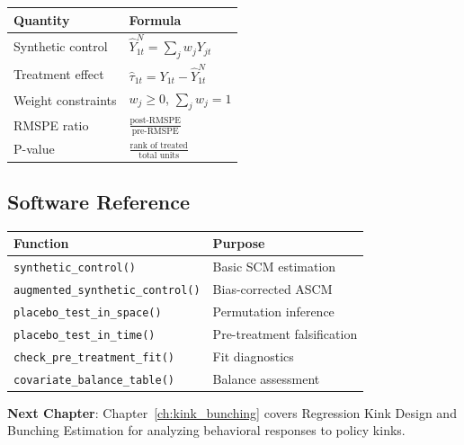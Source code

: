 \begin{center}
\begin{tabular}{ll}
\toprule
\textbf{Quantity} & \textbf{Formula} \\
\midrule
Synthetic control & $\hat{Y}_{1t}^N = \sum_j w_j Y_{jt}$ \\
Treatment effect & $\hat{\tau}_{1t} = Y_{1t} - \hat{Y}_{1t}^N$ \\
Weight constraints & $w_j \geq 0$, $\sum_j w_j = 1$ \\
RMSPE ratio & $\frac{\text{post-RMSPE}}{\text{pre-RMSPE}}$ \\
P-value & $\frac{\text{rank of treated}}{\text{total units}}$ \\
\bottomrule
\end{tabular}
\end{center}

\subsection{Software Reference}

\begin{center}
\begin{tabular}{ll}
\toprule
\textbf{Function} & \textbf{Purpose} \\
\midrule
\texttt{synthetic\_control()} & Basic SCM estimation \\
\texttt{augmented\_synthetic\_control()} & Bias-corrected ASCM \\
\texttt{placebo\_test\_in\_space()} & Permutation inference \\
\texttt{placebo\_test\_in\_time()} & Pre-treatment falsification \\
\texttt{check\_pre\_treatment\_fit()} & Fit diagnostics \\
\texttt{covariate\_balance\_table()} & Balance assessment \\
\bottomrule
\end{tabular}
\end{center}

\vspace{1em}
\noindent\textbf{Next Chapter}: Chapter~\ref{ch:kink_bunching} covers Regression Kink Design and Bunching Estimation for analyzing behavioral responses to policy kinks.
